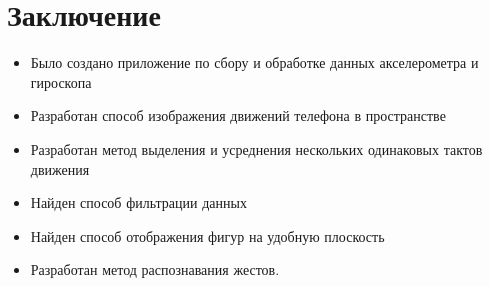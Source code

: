 \section{Заключение}
\begin{itemize}
    \item Было создано приложение по сбору и обработке данных акселерометра и гироскопа
    \item Разработан способ изображения движений телефона в пространстве
    \item Разработан метод выделения и усреднения нескольких одинаковых тактов движения
    \item Найден способ фильтрации данных
    \item Найден способ отображения фигур на удобную плоскость
    \item Разработан метод распознавания жестов.
\end{itemize}